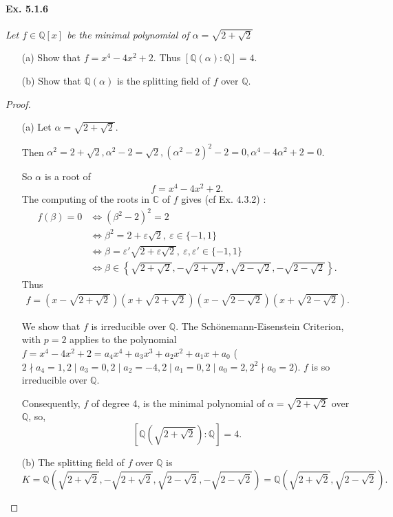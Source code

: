 \documentclass[11pt,a4paper]{article}
\newcommand{\Q}{\mathbb{Q}}
\newcommand{\C}{\mathbb{C}}
\begin{document}
\paragraph{Ex. 5.1.6}

{\it Let $f\in \Q[x]$ be the minimal polynomial of $\alpha = \sqrt{2+\sqrt{2}}$
\begin{enumerate}
\item[(a)] Show that $f = x^4-4x^2+2$. Thus $[\Q(\alpha) : \Q]=4$.
\item[(b)] Show that $\Q(\alpha)$ is the splitting field of $f$ over $\Q$.
\end{enumerate}
}

\begin{proof}
\begin{enumerate}
\item[(a)]
Let $\alpha= \sqrt{2+\sqrt{2}}$. 

Then $\alpha^2 = 2 + \sqrt{2}, \alpha^2-2 = \sqrt{2}, (\alpha^2-2)^2 - 2= 0, \alpha^4 - 4 \alpha^2 + 2 = 0$.

 So $\alpha$ is a root of
$$f= x^4-4x^2+2.$$
The computing of the roots in $\C$ of $f$ gives (cf Ex. 4.3.2) : 
\begin{align*}
f(\beta) = 0 &\iff (\beta^2-2)^2 = 2\\
&\iff \beta^2 = 2 +\varepsilon \sqrt{2}, \ \varepsilon \in \{-1,1\}\\
&\iff \beta =\varepsilon' \sqrt{2 +\varepsilon \sqrt{2}},\  \varepsilon, \varepsilon' \in \{-1,1\}\\
&\iff \beta \in \left\{   \sqrt{2+\sqrt{2}}, -\sqrt{2+\sqrt{2}}, \sqrt{2-\sqrt{2}},-\sqrt{2-\sqrt{2}}\right\}.
\end{align*}
Thus 
\begin{align}
f = \left(x-\sqrt{2+\sqrt{2}}\right)\left(x+\sqrt{2+\sqrt{2}}\right)\left(x-\sqrt{2-\sqrt{2}}\right)\left(x+\sqrt{2-\sqrt{2}}\right).
\end{align}

We show that $f$ is irreducible over $\Q$.
The Sch\"onemann-Eisenstein Criterion,  with $p=2$ applies to the polynomial $f= x^4-4x^2+2 = a_4x^4+a_3x^3+a_2x^2+a_1x+a_0$ 
($2 \nmid a_4 =1, 2 \mid a_3=0,2\mid a_2=-4, 2 \mid a_1=0,2 \mid a_0=2,  2^2 \nmid a_0 = 2$). $f$ is so irreducible over $\mathbb{Q}$.

Consequently, $f$ of degree 4, is the minimal polynomial of $\alpha=  \sqrt{2+\sqrt{2}}$ over $\Q$, so,
$$\left[\Q\left(\sqrt{2+\sqrt{2}}\right):\Q\right] = 4.$$

\item[(b)]
The splitting field of $f$ over $\Q$ is $$K=\Q\left( \sqrt{2+\sqrt{2}}, -\sqrt{2+\sqrt{2}}, \sqrt{2-\sqrt{2}},-\sqrt{2-\sqrt{2}}\right) = \Q\left( \sqrt{2+\sqrt{2}} , \sqrt{2-\sqrt{2}}\right).$$


\end{enumerate}
\end{proof}
\end{document}
